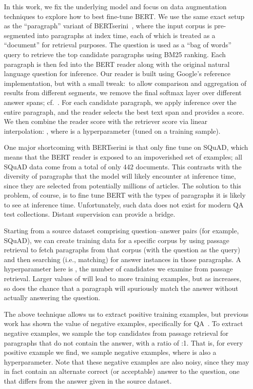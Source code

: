 \documentclass[11pt,a4paper]{article}
\begin{document}
In this work, we fix the underlying model and focus on data augmentation techniques to explore how to best fine-tune BERT.
We use the same exact setup as the ``paragraph'' variant of BERTserini~\cite{yang2019end}, where the input corpus is pre-segmented into paragraphs at index time, each of which is treated as a ``document'' for retrieval purposes.
The question is used as a ``bag of words'' query to retrieve the top  candidate paragraphs using BM25 ranking.
Each paragraph is then fed into the BERT reader along with the original natural language question for inference.
Our reader is built using Google's reference implementation, but with a small tweak:\ to allow comparison and aggregation of results from different segments, we remove the final softmax layer over different answer spans; cf.~\cite{P18-1078}.
For each candidate paragraph, we apply inference over the entire paragraph, and the reader selects the best text span and provides a score.
We then combine the reader score with the retriever score via linear interpolation: , 
where  is a hyperparameter (tuned on a training sample).

One major shortcoming with BERTserini is that \citet{yang2019end} only fine tune on SQuAD, which means that the BERT reader is exposed to an impoverished set of examples; all SQuAD data come from a total of only 442 documents.
This contrasts with the diversity of paragraphs that the model will likely encounter at inference time, since they are selected from potentially millions of articles.
The solution to this problem, of course, is to fine tune BERT with the types of paragraphs it is likely to see at inference time.
Unfortunately, such data does not exist for modern QA test collections.
Distant supervision can provide a bridge.

Starting from a source dataset comprising question--answer pairs (for example, SQuAD), we can create training data for a specific corpus by using passage retrieval to fetch paragraphs from that corpus (with the question as the query) and then searching (i.e., matching) for answer instances in those paragraphs.
A hyperparameter here is , the number of candidates we examine from passage retrieval.
Larger values of  will lead to more training examples, but as  increases, so does the chance that a paragraph will spuriously match the answer without actually answering the question.

The above technique allows us to extract positive training examples, but previous work has shown the value of negative examples, specifically for QA~\cite{Zhang:2017:AEH:3077136.3080645}.
To extract negative examples, we sample the top  candidates from passage retrieval for paragraphs that do not contain the answer, with a ratio of :1.
That is, for every positive example we find, we sample  negative examples, where  is also a hyperparameter.
Note that these negative examples are also noisy, since they may in fact contain an alternate correct (or acceptable) answer to the question, one that differs from the answer given in the source dataset.
\end{document}

